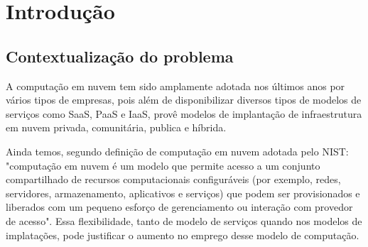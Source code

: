 \chapter{\label{chap:intro}Introdução}




%
%
%
%

\section{Contextualização do problema}

A computação em nuvem tem sido amplamente adotada nos últimos anos por vários tipos de empresas, pois além de disponibilizar diversos tipos de modelos de serviços como SaaS, PaaS e IaaS, provê modelos de implantação de infraestrutura em nuvem privada, comunitária, publica e híbrida.

Ainda temos, segundo definição de computação em nuvem adotada pelo NIST\cite{Mell:2011}: "computação em nuvem é um modelo que permite acesso a um conjunto compartilhado de recursos computacionais configuráveis (por exemplo, redes, servidores, armazenamento, aplicativos e serviços) que podem ser provisionados e liberados  com um pequeno esforço de gerenciamento ou interação com provedor de acesso".
Essa flexibilidade, tanto de modelo de serviços quando nos modelos de implatações, pode justificar o aumento no emprego desse modelo de computação.

